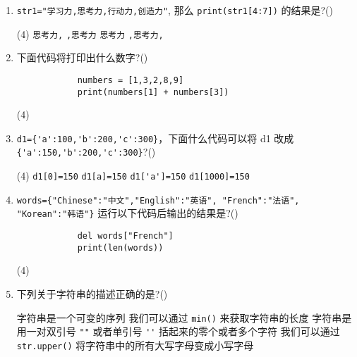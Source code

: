 \documentclass[11pt]{ctexart}
\begin{document}
\begin{enumerate}
        \item \lstinline{str1="学习力,思考力,行动力,创造力"}, 那么 \lstinline{print(str1[4:7])} 的结果是?(\qquad)
        \begin{tasks}(4)
            \task \lstinline{思考力,}
            \task \lstinline{,思考力}
            \task \lstinline!思考力!
            \task \lstinline{,思考力,}
        \end{tasks}

        \item 下面代码将打印出什么数字?(\qquad)
        \begin{lstlisting}
            numbers = [1,3,2,8,9]
            print(numbers[1] + numbers[3])
        \end{lstlisting}
        \begin{tasks}(4)
        \end{tasks}

        \item \lstinline!d1={'a':100,'b':200,'c':300}!，下面什么代码可以将 d1 改成\lstinline!{'a':150,'b':200,'c':300}!?(\qquad)
        \begin{tasks}(4)
            \task \lstinline{d1[0]=150}
            \task \lstinline{d1[a]=150}
            \task \lstinline{d1['a']=150}
            \task \lstinline{d1[1000]=150}
        \end{tasks}

        \item \lstinline!words={"Chinese":"中文","English":"英语", "French":"法语", "Korean":"韩语"}! 运行以下代码后输出的结果是?(\qquad)
        \begin{lstlisting}
            del words["French"]
            print(len(words))
        \end{lstlisting}
        \begin{tasks}(4)
        \end{tasks}

        \item 下列关于字符串的描述正确的是?(\qquad)
        \begin{tasks}
            \task 字符串是一个可变的序列
            \task 我们可以通过 \lstinline!min()! 来获取字符串的长度
            \task 字符串是用一对双引号 \lstinline!""! 或者单引号 \lstinline!''! 括起来的零个或者多个字符
            \task 我们可以通过 \lstinline!str.upper()! 将字符串中的所有大写字母变成小写字母
        \end{tasks}


\end{enumerate}
\end{document}
